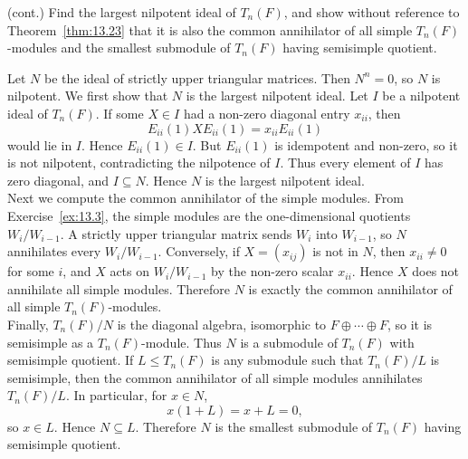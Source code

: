 \documentclass[../Odyssey_Project.tex]{subfiles}
\begin{document}
\begin{exercise}
\label{ex:13.5}
(cont.) Find the largest nilpotent ideal of $T_n(F)$, and show without reference to Theorem~\ref{thm:13.23} that it is also the common annihilator of all simple $T_n(F)$-modules and the smallest submodule of $T_n(F)$ having semisimple quotient.
\end{exercise}
\begin{solution}
    Let $N$ be the ideal of strictly upper triangular matrices. Then $N^n=0$, so $N$ is nilpotent. We first show that $N$ is the largest nilpotent ideal. Let $I$ be a nilpotent ideal of $T_n(F)$. If some $X\in I$ had a non-zero diagonal entry $x_{ii}$, then
    \[
        E_{ii}(1)XE_{ii}(1)=x_{ii}E_{ii}(1)
    \]
    would lie in $I$. Hence $E_{ii}(1)\in I$. But $E_{ii}(1)$ is idempotent and non-zero, so it is not nilpotent, contradicting the nilpotence of $I$. Thus every element of $I$ has zero diagonal, and $I\subseteq N$. Hence $N$ is the largest nilpotent ideal.\\
    Next we compute the common annihilator of the simple modules. From Exercise~\ref{ex:13.3}, the simple modules are the one-dimensional quotients $W_i/W_{i-1}$. A strictly upper triangular matrix sends $W_i$ into $W_{i-1}$, so $N$ annihilates every $W_i/W_{i-1}$. Conversely, if $X=(x_{ij})$ is not in $N$, then $x_{ii}\neq0$ for some $i$, and $X$ acts on $W_i/W_{i-1}$ by the non-zero scalar $x_{ii}$. Hence $X$ does not annihilate all simple modules. Therefore $N$ is exactly the common annihilator of all simple $T_n(F)$-modules.\\
    Finally, $T_n(F)/N$ is the diagonal algebra, isomorphic to $F\oplus\cdots\oplus F$, so it is semisimple as a $T_n(F)$-module. Thus $N$ is a submodule of $T_n(F)$ with semisimple quotient. If $L\leq T_n(F)$ is any submodule such that $T_n(F)/L$ is semisimple, then the common annihilator of all simple modules annihilates $T_n(F)/L$. In particular, for $x\in N$,
    \[
        x(1+L)=x+L=0,
    \]
    so $x\in L$. Hence $N\subseteq L$. Therefore $N$ is the smallest submodule of $T_n(F)$ having semisimple quotient.
\end{solution}
\end{document}
